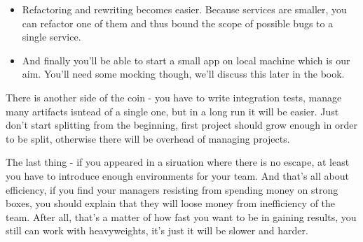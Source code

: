 \begin{itemize}
  \item Refactoring and rewriting becomes easier. Because services are smaller, you can refactor one of them and thus bound the scope of possible bugs to a single service.
  \item And finally you'll be able to start a small app on local machine which is our aim. You'll need some mocking though, we'll discuss this later in the book.
\end{itemize}
There is another side of the coin - you have to write integration tests, manage many artifacts isntead of a single one, but in a long run it will be easier. Just don't start splitting from the beginning, first project should grow enough in order to be split, otherwise there will be overhead of managing projects.

The last thing - if you appeared in a siruation where there is no escape, at least you have to introduce enough environments for your team. And that's all about efficiency, if you find your managers resisting from spending money on strong boxes, you should explain that they will loose money from inefficiency of the team. After all, that's a matter of how fast you want to be in gaining results, you still can work with heavyweights, it's just it will be slower and harder.


